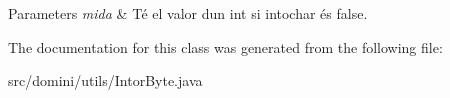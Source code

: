 \begin{DoxyParams}{Parameters}
{\em mida} & Té el valor d\textquotesingle{}un int si intochar és false. \\
\hline
\end{DoxyParams}


The documentation for this class was generated from the following file\+:\begin{DoxyCompactItemize}
\item 
src/domini/utils/Intor\+Byte.\+java\end{DoxyCompactItemize}

